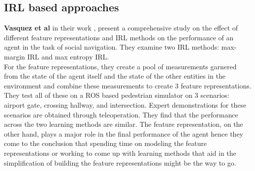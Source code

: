 \subsection*{IRL based approaches}

\textbf{Vasquez et al} in their work \cite{vasquez_inverse_2014}, present a comprehensive study on the effect of different feature representations and IRL methods on the performance of an agent in the task of social navigation. They examine two IRL methods:
max-margin IRL and max entropy IRL.\\
For the feature representations, they create a pool of measurements garnered from the state of the agent itself and the state of the other entities in the environment and combine these measurements to create 3 feature representations. \\
They test all of these on a ROS based pedestrian simulator on 3 scenarios: airport gate, crossing hallway, and intersection. Expert demonstrations for these scenarios are obtained through teleoperation. They find that the performance across the two learning methods are similar. The feature representation, on the other hand, plays a major role in the final performance of the agent hence they come to the conclusion that spending time on modeling the feature representations or working to come up with learning methods that aid in the simplification of building the feature representations might be the way to go.\\

